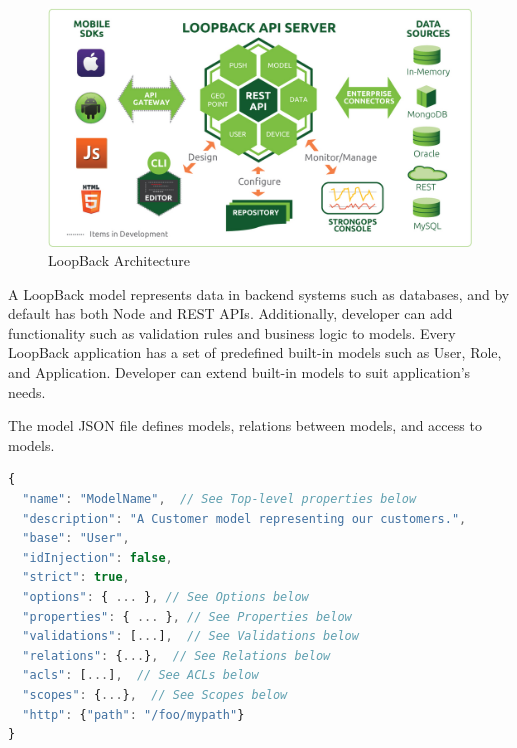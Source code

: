 \begin {figure}[h]
\graphicspath{{images/chapter_TCH/}}
\includegraphics[width=\textwidth]{loopback_1}
\caption{LoopBack Architecture}
\end {figure}



A LoopBack model represents data in backend systems such as databases, and by default has both Node and REST APIs.  Additionally, developer can add functionality such as validation rules and business logic to models.
Every LoopBack application has a set of predefined built-in models such as User, Role, and Application.  Developer can extend built-in models to suit application's needs.

The model JSON file defines models, relations between models, and access to models. 

\begin{lstlisting}[language=javascript]
{
  "name": "ModelName",  // See Top-level properties below
  "description": "A Customer model representing our customers.",
  "base": "User",
  "idInjection": false,
  "strict": true,
  "options": { ... }, // See Options below
  "properties": { ... }, // See Properties below
  "validations": [...],  // See Validations below
  "relations": {...},  // See Relations below
  "acls": [...],  // See ACLs below
  "scopes": {...},  // See Scopes below
  "http": {"path": "/foo/mypath"}
}
\end{lstlisting}

